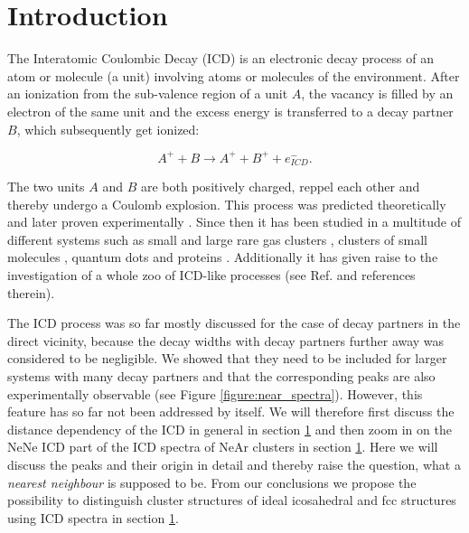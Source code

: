 \section{Introduction}

The Interatomic Coulombic Decay (ICD) is an electronic decay process of an atom or
molecule (a unit) involving atoms or molecules of the environment. After an
ionization from the sub-valence region of a unit $A$, the vacancy is filled
by an electron of the same unit and the excess energy is transferred to a decay
partner $B$, which subsequently get ionized:

\begin{equation*}
 A^+ + B \rightarrow A^+ + B^+ + e^-_{ICD}  .
\end{equation*}

The two units $A$ and $B$ are both positively charged, reppel each other and
thereby undergo a Coulomb explosion. This process was predicted theoretically
\cite{Cederbaum97} and later proven experimentally \cite{Marburger03}. Since then
it has been studied in a multitude of different systems such as small and large
rare gas clusters \cite{many,Fasshauer14_1},
clusters of small molecules \cite{},
quantum dots \cite{Bande13}
and proteins \cite{Harbach13}. Additionally it has given raise to
the investigation of a whole zoo of ICD-like processes (see Ref. \cite{}
and references therein).

The ICD process was so far mostly discussed for the case of decay partners in
the direct vicinity, because the decay widths with decay partners further away
was considered to be negligible. We showed that they need to be included
for larger systems with many decay partners \cite{Fasshauer13} and that the
corresponding peaks are also experimentally observable \cite{Fasshauer14_1}
(see Figure \ref{figure:near_spectra}).
However, this feature has so far not been addressed by itself. We will
therefore first discuss the distance dependency of the ICD in general
in section \ref{} and then
zoom in on the NeNe ICD part of the ICD spectra of NeAr clusters in section
\ref{}. Here we will discuss the peaks and their origin in detail and thereby
raise the question, what a \emph{nearest neighbour} is supposed to be. From
our conclusions we propose the possibility to distinguish cluster structures
of ideal icosahedral and fcc structures using ICD spectra in section \ref{}.

